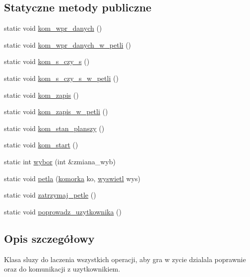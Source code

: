 \subsection*{Statyczne metody publiczne}
\begin{DoxyCompactItemize}
\item 
static void \mbox{\hyperlink{classmenue_a799c1d6893e274fc84d5fc83229e740a}{kom\+\_\+wpr\+\_\+danych}} ()
\item 
static void \mbox{\hyperlink{classmenue_a3902f4dcca17c168edf03ae828719e3d}{kom\+\_\+wpr\+\_\+danych\+\_\+w\+\_\+petli}} ()
\item 
static void \mbox{\hyperlink{classmenue_a1f0607fc914414d432e6612a0e20668d}{kom\+\_\+s\+\_\+czy\+\_\+s}} ()
\item 
static void \mbox{\hyperlink{classmenue_a4c13c8e43e1fe3c1eaf62543c126a6b7}{kom\+\_\+s\+\_\+czy\+\_\+s\+\_\+w\+\_\+petli}} ()
\item 
static void \mbox{\hyperlink{classmenue_a96748d0634771d7150c1eb73ed7472c5}{kom\+\_\+zapis}} ()
\item 
static void \mbox{\hyperlink{classmenue_a303502c5a160ee276a3ac7ce21ef4f4f}{kom\+\_\+zapis\+\_\+w\+\_\+petli}} ()
\item 
static void \mbox{\hyperlink{classmenue_a0a628bf84deb7c82ff352e762a6ddbba}{kom\+\_\+stan\+\_\+planszy}} ()
\item 
static void \mbox{\hyperlink{classmenue_a3d62c66c619cbd4ae2fea6dc5a96ec51}{kom\+\_\+start}} ()
\item 
static int \mbox{\hyperlink{classmenue_af6a59b2891dfcc8df337d3ac11fb767d}{wybor}} (int \&zmiana\+\_\+wyb)
\item 
static void \mbox{\hyperlink{classmenue_a13c6c317f85272bf3fd49ff0ad93b28a}{petla}} (\mbox{\hyperlink{classkomorka}{komorka}} ko, \mbox{\hyperlink{classwyswietl}{wyswietl}} wys)
\item 
static void \mbox{\hyperlink{classmenue_a361a3472705b073f0cc7ae3e93576f04}{zatrzymaj\+\_\+petle}} ()
\item 
static void \mbox{\hyperlink{classmenue_aef7d47abaf00296cef8820ac538f017e}{poprowadz\+\_\+uzytkownika}} ()
\end{DoxyCompactItemize}


\subsection{Opis szczegółowy}
Klasa sluzy do laczenia wszystkich operacji, aby gra w zycie dzialala poprawnie oraz do komunikacji z uzytkownikiem. 

